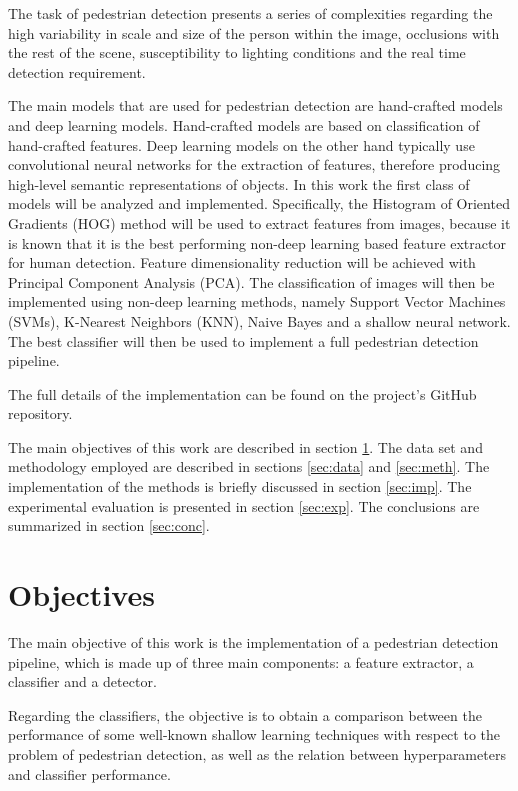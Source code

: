 \documentclass[journal,twocolumn]{IEEEtran}
\begin{document}
The task of pedestrian detection presents a series of complexities regarding the high variability in scale and size of the
person within the image, occlusions with the rest of the scene,
susceptibility to lighting conditions and the real time detection
requirement.

The main models that are used for pedestrian detection are
hand-crafted models and deep learning models. Hand-crafted
models are based on classification of hand-crafted features. Deep learning models on the other hand typically use
convolutional neural networks for the extraction of features,
therefore producing high-level semantic representations of
objects.
In this work the first class of models will be analyzed
and implemented. Specifically, the Histogram of Oriented
Gradients (HOG) method will be used to extract features from
images, because it is known\cite{2} that it is the best performing non-deep learning based feature extractor for human detection. Feature dimensionality reduction will be achieved with Principal Component Analysis (PCA). The classification of images will then be implemented
using non-deep learning methods, namely Support Vector
Machines (SVMs), K-Nearest Neighbors (KNN), Naive Bayes and a shallow neural network. The best classifier will then be used to implement a full pedestrian detection pipeline.

The full details of the implementation can be found on the project's GitHub repository\cite{4}.

The main objectives of this work are described in section
\ref{sec:obj}. The data set and methodology employed are described in
sections \ref{sec:data} and \ref{sec:meth}. The implementation of the methods is briefly discussed in section \ref{sec:imp}. The experimental evaluation is presented
in section \ref{sec:exp}. The conclusions are summarized in section \ref{sec:conc}.

\section{Objectives}
\label{sec:obj}
The main objective of this work is the implementation of
a pedestrian detection pipeline, which is made up
of three main components: a feature extractor, a classifier and a
detector.

Regarding the classifiers, the objective is to obtain a comparison between the performance of some well-known shallow learning techniques with respect to the problem of pedestrian detection, as well as the relation between hyperparameters and classifier performance.
\end{document}

